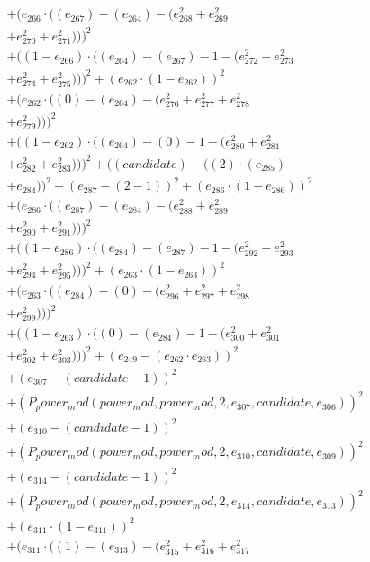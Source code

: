 \documentclass[10pt, a4paper]{article}
\begin{document}
\begin{small}
\begin{align*}
& + (e_{266}  \cdot  ((e_{267}) - (e_{264}) - (e_{268}^{2} + e_{269}^{2} \\
& + e_{270}^{2} + e_{271}^{2})))^{2} \\
& + ((1 - e_{266})  \cdot  ((e_{264}) - (e_{267}) - 1 - (e_{272}^{2} + e_{273}^{2} \\
& + e_{274}^{2} + e_{275}^{2})))^{2} + (e_{262}  \cdot  (1 - e_{262}))^{2} \\
& + (e_{262}  \cdot  ((0) - (e_{264}) - (e_{276}^{2} + e_{277}^{2} + e_{278}^{2} \\
& + e_{279}^{2})))^{2} \\
& + ((1 - e_{262})  \cdot  ((e_{264}) - (0) - 1 - (e_{280}^{2} + e_{281}^{2} \\
& + e_{282}^{2} + e_{283}^{2})))^{2} + ((candidate) - ((2)  \cdot  (e_{285}) \\
& + e_{284}))^{2} + (e_{287} - (2 - 1))^{2} + (e_{286}  \cdot  (1 - e_{286}))^{2} \\
& + (e_{286}  \cdot  ((e_{287}) - (e_{284}) - (e_{288}^{2} + e_{289}^{2} \\
& + e_{290}^{2} + e_{291}^{2})))^{2} \\
& + ((1 - e_{286})  \cdot  ((e_{284}) - (e_{287}) - 1 - (e_{292}^{2} + e_{293}^{2} \\
& + e_{294}^{2} + e_{295}^{2})))^{2} + (e_{263}  \cdot  (1 - e_{263}))^{2} \\
& + (e_{263}  \cdot  ((e_{284}) - (0) - (e_{296}^{2} + e_{297}^{2} + e_{298}^{2} \\
& + e_{299}^{2})))^{2} \\
& + ((1 - e_{263})  \cdot  ((0) - (e_{284}) - 1 - (e_{300}^{2} + e_{301}^{2} \\
& + e_{302}^{2} + e_{303}^{2})))^{2} + (e_{249} - (e_{262}  \cdot  e_{263}))^{2} \\
& + (e_{307} - (candidate - 1))^{2} \\
& + (P_power_mod(power_mod, power_mod, 2, e_{307}, candidate, e_{306}))^{2} \\
& + (e_{310} - (candidate - 1))^{2} \\
& + (P_power_mod(power_mod, power_mod, 2, e_{310}, candidate, e_{309}))^{2} \\
& + (e_{314} - (candidate - 1))^{2} \\
& + (P_power_mod(power_mod, power_mod, 2, e_{314}, candidate, e_{313}))^{2} \\
& + (e_{311}  \cdot  (1 - e_{311}))^{2} \\
& + (e_{311}  \cdot  ((1) - (e_{313}) - (e_{315}^{2} + e_{316}^{2} + e_{317}^{2} \\

\end{align*}
\end{small}
\end{document}
